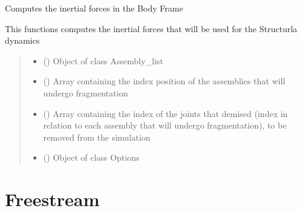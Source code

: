 \documentclass[letterpaper,10pt,english]{sphinxmanual}
\begin{document}
\begin{fulllineitems}
\label{\detokenize{modules:fragmentation.demise_components}}
\pysigstartsignatures
{}
\pysigstopsignatures
\sphinxAtStartPar
Computes the inertial forces in the Body Frame

\sphinxAtStartPar
This functions computes the inertial forces that will be used for the Structurla dynamics
\begin{quote}\begin{description}
\begin{itemize}
\item {} 
\sphinxAtStartPar
{} ({\hyperref[\detokenize{modules:assembly.Assembly_list}]{}}) \textendash{} Object of class Assembly\_list

\item {} 
\sphinxAtStartPar
{} () \textendash{} Array containing the index position of the assemblies that will undergo fragmentation

\item {} 
\sphinxAtStartPar
{} () \textendash{} Array containing the index of the joints that demised (index in relation to each assembly that will undergo fragmentation), to be removed from the simulation

\item {} 
\sphinxAtStartPar
{} ({\hyperref[\detokenize{modules:configuration.Options}]{}}) \textendash{} Object of class Options

\end{itemize}

\end{description}\end{quote}

\end{fulllineitems}



\section{Freestream}
\label{\detokenize{modules:freestream}}
\end{document}
